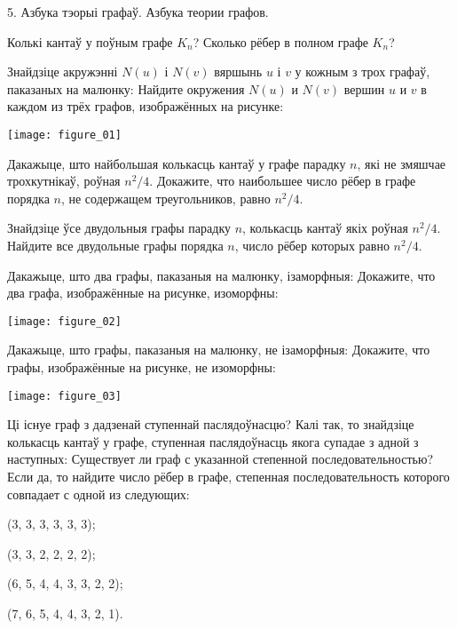 \documentclass[12pt, a4paper]{article}
\begin{document}
\biLangHeader
{5. Азбука тэорыі графаў.}
{Азбука теории графов.}

\begin{problemList}

\problemItemSimple
{Колькі кантаў у поўным графе $K_n$?}
{Сколько рёбер в полном графе $K_n$?}

\bigskip

\problemItemWithCommonPart
{Знайдзіце акружэнні $N(u)$ і $N(v)$ вяршынь $u$ і $v$ у кожным з трох графаў, паказаных на малюнку:}
{Найдите окружения $N(u)$ и $N(v)$ вершин $u$ и $v$ в каждом из трёх графов, изображённых на рисунке:}
{%
\begin{center}
    \texttt{[image: figure\_01]}
\end{center}
}

\problemItemSimple
{Дакажыце, што найбольшая колькасць кантаў у графе парадку $n$, які не змяшчае трохкутнікаў, роўная $n^2/4$.}
{Докажите, что наибольшее число рёбер в графе порядка $n$, не содержащем треугольников, равно $n^2/4$.}

\bigskip

\problemItemSimple
{Знайдзіце ўсе двудольныя графы парадку $n$, колькасць кантаў якіх роўная $n^2/4$.}
{Найдите все двудольные графы порядка $n$, число рёбер которых равно $n^2/4$.}

\bigskip

\problemItemWithCommonPart
{Дакажыце, што два графы, паказаныя на малюнку, ізаморфныя:}
{Докажите, что два графа, изображённые на рисунке, изоморфны:}
{%
\begin{center}
    \texttt{[image: figure\_02]}
\end{center}
}

\problemItemWithCommonPart
{Дакажыце, што графы, паказаныя на малюнку, не ізаморфныя:}
{Докажите, что графы, изображённые на рисунке, не изоморфны:}
{%
\begin{center}
    \texttt{[image: figure\_03]}
\end{center}
}

\problemItemWithCommonPart
{Ці існуе граф з дадзенай ступеннай паслядоўнасцю?
Калі так, то знайдзіце колькасць кантаў у графе,
ступенная паслядоўнасць якога супадае з адной з наступных:}
{Существует ли граф с указанной степенной последовательностью?
Если да, то найдите число рёбер в графе,
степенная последовательность которого совпадает с одной из следующих:}
{%
\begin{belarusianEnumerateTwocol}
    \item (3, 3, 3, 3, 3, 3);
    \item (3, 3, 2, 2, 2, 2);
    \item (6, 5, 4, 4, 3, 3, 2, 2);
    \item (7, 6, 5, 4, 4, 3, 2, 1).
\end{belarusianEnumerateTwocol}
}


\end{problemList}
\end{document}
